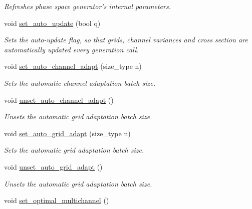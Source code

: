 \begin{DoxyCompactItemize}
\begin{DoxyCompactList}\small\item\em Refreshes phase space generator's internal parameters. \end{DoxyCompactList}\item 
void \hyperlink{a00430_a225492c21d401713bb58fb9551743abf}{set\-\_\-auto\-\_\-update} (bool q)
\begin{DoxyCompactList}\small\item\em Sets the auto-\/update flag, so that grids, channel variances and cross section are automatically updated every generation call. \end{DoxyCompactList}\item 
void \hyperlink{a00430_aeb0b6fdf895af500c99f58638b6811be}{set\-\_\-auto\-\_\-channel\-\_\-adapt} (size\-\_\-type n)
\begin{DoxyCompactList}\small\item\em Sets the automatic channel adaptation batch size. \end{DoxyCompactList}\item 
\hypertarget{a00430_a3b52d1b0fa84e1c17ba0b65c5a6c4c2f}{void \hyperlink{a00430_a3b52d1b0fa84e1c17ba0b65c5a6c4c2f}{unset\-\_\-auto\-\_\-channel\-\_\-adapt} ()}\label{a00430_a3b52d1b0fa84e1c17ba0b65c5a6c4c2f}

\begin{DoxyCompactList}\small\item\em Unsets the automatic grid adaptation batch size. \end{DoxyCompactList}\item 
void \hyperlink{a00430_ad6007f69b82d4971795d5dcacc568fc2}{set\-\_\-auto\-\_\-grid\-\_\-adapt} (size\-\_\-type n)
\begin{DoxyCompactList}\small\item\em Sets the automatic grid adaptation batch size. \end{DoxyCompactList}\item 
\hypertarget{a00430_a43c7c3764692c4abd7ebe9cac264a213}{void \hyperlink{a00430_a43c7c3764692c4abd7ebe9cac264a213}{unset\-\_\-auto\-\_\-grid\-\_\-adapt} ()}\label{a00430_a43c7c3764692c4abd7ebe9cac264a213}

\begin{DoxyCompactList}\small\item\em Unsets the automatic grid adaptation batch size. \end{DoxyCompactList}\item 
\hypertarget{a00430_a5e12bf83f04600b41865655b67103e08}{void \hyperlink{a00430_a5e12bf83f04600b41865655b67103e08}{set\-\_\-optimal\-\_\-multichannel} ()}\label{a00430_a5e12bf83f04600b41865655b67103e08}


\end{DoxyCompactItemize}
